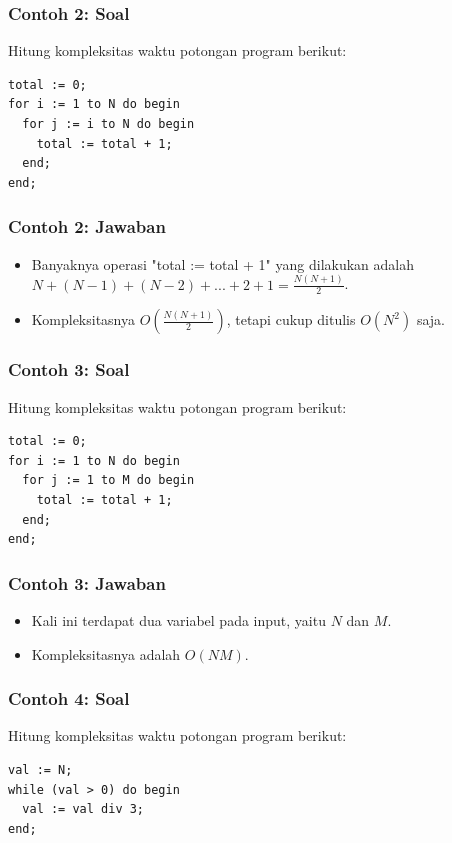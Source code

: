 \documentclass{beamer}
\begin{document}
\begin{frame}[fragile]
\frametitle{Contoh 2: Soal}
Hitung kompleksitas waktu potongan program berikut:

\hfill

\begin{lstlisting}
total := 0;
for i := 1 to N do begin
  for j := i to N do begin
    total := total + 1;
  end;
end;
\end{lstlisting}
\end{frame}

\begin{frame}
\frametitle{Contoh 2: Jawaban}
\begin{itemize}
    \item Banyaknya operasi "total := total + 1" yang dilakukan adalah $N + (N-1) + (N-2) + ... + 2 + 1 = \frac{N(N+1)}{2}$.
    \item Kompleksitasnya $O \left( \frac{N(N+1)}{2} \right)$, tetapi cukup ditulis $O(N^2)$ saja.
\end{itemize}
\end{frame}

\begin{frame}[fragile]
\frametitle{Contoh 3: Soal}
Hitung kompleksitas waktu potongan program berikut:

\hfill

\begin{lstlisting}
total := 0;
for i := 1 to N do begin
  for j := 1 to M do begin
    total := total + 1;
  end;
end;
\end{lstlisting}
\end{frame}

\begin{frame}
\frametitle{Contoh 3: Jawaban}
\begin{itemize}
    \item Kali ini terdapat dua variabel pada input, yaitu $N$ dan $M$.
    \item Kompleksitasnya adalah $O(NM)$.
\end{itemize}
\end{frame}

\begin{frame}[fragile]
\frametitle{Contoh 4: Soal}
Hitung kompleksitas waktu potongan program berikut:

\hfill

\begin{lstlisting}
val := N;
while (val > 0) do begin
  val := val div 3;
end;
\end{lstlisting}
\end{frame}
\end{document}
